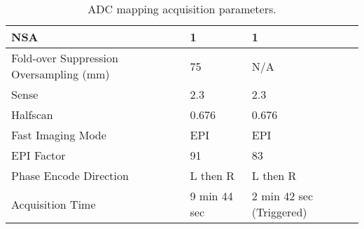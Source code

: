\begin{table}[H]
\begin{tabularx}{1.0\textwidth}{X|X|X}
	NSA                                     & 1                                                                                & 1                                                                                \\ \hline
	Fold-over Suppression Oversampling (mm) & 75                                                                               & N/A                                                                              \\ \hline
	Sense                                   & 2.3                                                                              & 2.3                                                                              \\ \hline
	Halfscan                                & 0.676                                                                            & 0.676                                                                            \\ \hline
	Fast Imaging Mode                       & EPI                                                                              & EPI                                                                              \\ \hline
	EPI Factor                              & 91                                                                               & 83                                                                               \\ \hline
	Phase Encode Direction                  & L then R                                                                         & L then R                                                                         \\ \hline
	Acquisition Time                        & 9 min 44 sec                                                                     & 2 min 42 sec (Triggered)                                                        
	\end{tabularx}
	\caption{\ac{ADC} mapping acquisition parameters.}
	\label{tab:ex_adc_mapping}
\end{table}

